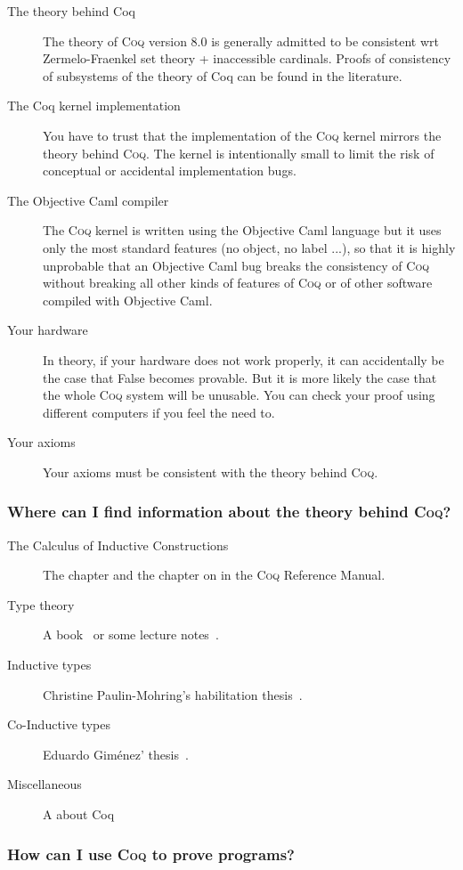 \documentclass[a4paper,pdftex]{article}
\def\Question#1{\stepcounter{question}\subsubsection{#1}}
\def\Coq{\textsc{Coq}}
\begin{document}
\begin{description}
\item[The theory behind Coq] The theory of {\Coq} version 8.0 is
generally admitted to be consistent wrt Zermelo-Fraenkel set theory +
inaccessible cardinals. Proofs of consistency of subsystems of the
theory of Coq can be found in the literature.
\item[The Coq kernel implementation] You have to trust that the
implementation of the {\Coq} kernel mirrors the theory behind {\Coq}. The
kernel is intentionally small to limit the risk of conceptual or
accidental implementation bugs.
\item[The Objective Caml compiler] The {\Coq} kernel is written using the
Objective Caml language but it uses only the most standard features
(no object, no label ...), so that it is highly unprobable that an
Objective Caml bug breaks the consistency of {\Coq} without breaking all
other kinds of features of {\Coq} or of other software compiled with
Objective Caml.
\item[Your hardware] In theory, if your hardware does not work
properly, it can accidentally be the case that False becomes
provable. But it is more likely the case that the whole {\Coq} system
will be unusable. You can check your proof using different computers
if you feel the need to.
\item[Your axioms] Your axioms must be consistent with the theory
behind {\Coq}.
\end{description}


\Question{Where can I find information about the theory behind {\Coq}?}
\begin{description}
\item[The Calculus of Inductive Constructions] The
chapter and the chapter on
 in
the {\Coq} Reference Manual.
\item[Type theory] A book~\cite{ProofsTypes} or some lecture
notes~\cite{Types:Dowek}.
\item[Inductive types]
Christine Paulin-Mohring's habilitation thesis~\cite{Pau96b}.
\item[Co-Inductive types]
Eduardo Giménez' thesis~\cite{EGThese}.
\item[Miscellaneous] A
 about Coq
\end{description}


\Question{How can I use {\Coq} to prove programs?}
\end{document}
